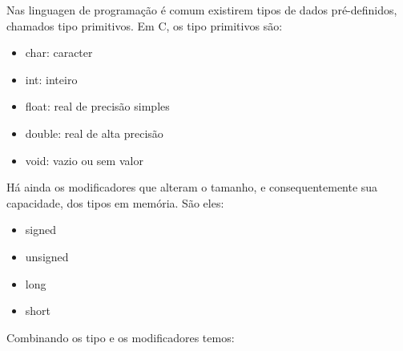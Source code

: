 \documentclass[11pt,fleqn]{book} %
\begin{document}
Nas linguagen de programação é comum existirem tipos de dados pré-definidos, chamados tipo primitivos.
Em C, os tipo primitivos são:

\begin{itemize}
	\item char: caracter
	\item int: inteiro
	\item float: real de precisão simples
	\item double: real de alta precisão
	\item void: vazio ou sem valor
\end{itemize}

Há ainda os modificadores que alteram o tamanho, e consequentemente sua capacidade, dos tipos em memória. São eles:

\begin{itemize}
	\item signed
	\item unsigned
	\item long
	\item short
\end{itemize}

Combinando os tipo e os modificadores temos:
\end{document}
